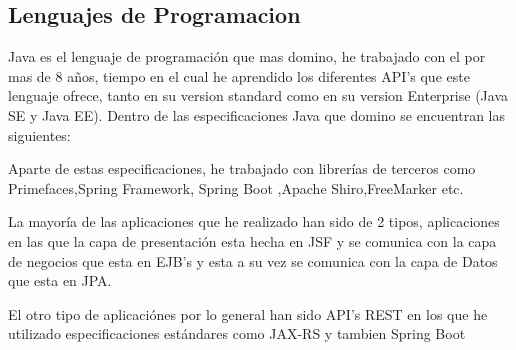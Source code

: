 \subsection{Lenguajes de Programacion}
Java es el lenguaje de programación que mas domino, he trabajado con el por mas de 8 años, tiempo en el cual he aprendido los diferentes API's que este lenguaje ofrece, tanto en su version standard como en su version Enterprise (Java SE y Java EE). 
Dentro de las especificaciones Java que domino se encuentran las siguientes:
\newline{}%


Aparte de estas especificaciones, he trabajado con librerías de terceros como Primefaces,Spring Framework, Spring Boot ,Apache Shiro,FreeMarker etc.

La mayoría de las aplicaciones que he realizado han sido de 2 tipos, aplicaciones en las que la capa de presentación esta hecha en JSF y se comunica con la capa de negocios que esta en EJB's y esta a su vez se comunica con la capa de Datos que esta en JPA.

El otro tipo de aplicaciónes por lo general han sido API's REST en los que he utilizado especificaciones estándares como JAX-RS y tambien Spring Boot
\newline{}%

